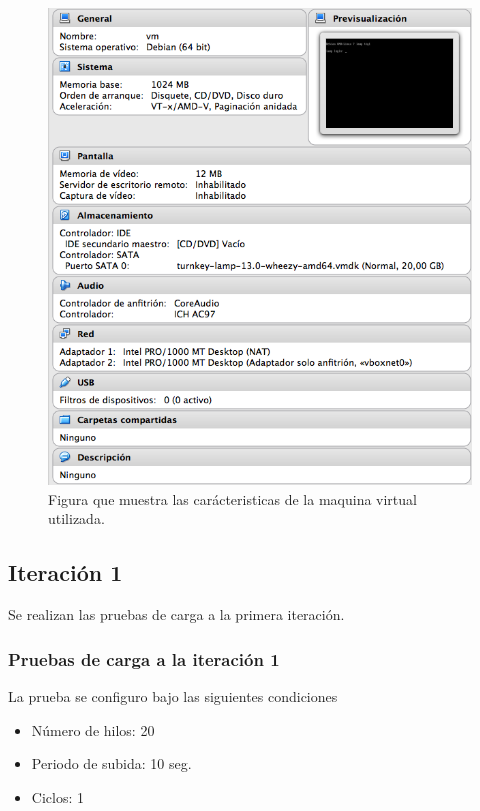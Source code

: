  \begin{figure}[htb]
 	\label{Figura8}
 	\begin{center}
 		\includegraphics[scale=0.5]{imagenes/sistema.png}
 		\caption{Figura que muestra las carácteristicas de la maquina virtual utilizada.}
 	\end{center}
 \end{figure}


\subsection{Iteración 1}

Se realizan las pruebas de carga a la primera iteración.

\subsubsection{Pruebas de carga a la iteración 1}

La prueba se configuro bajo las siguientes condiciones

\begin{itemize}
	\item Número de hilos: 20
	\item Periodo de subida: 10 seg.
	\item Ciclos: 1
\end{itemize}
 
